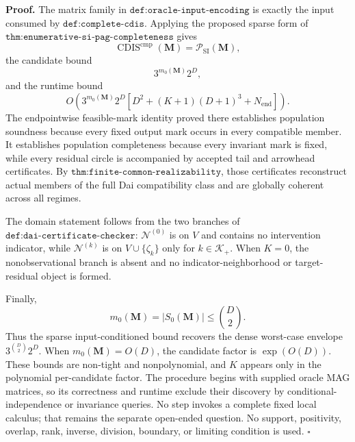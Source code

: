 \textbf{Proof.}
The matrix family in \(\texttt{def:oracle-input-encoding}\) is exactly the input consumed by \(\texttt{def:complete-cdis}\).  Applying the proposed sparse form of \(\texttt{thm:enumerative-si-pag-completeness}\) gives
\[
\operatorname{CDIS}^{\mathrm{cmp}}(\mathbf M)
=\mathcal P_{\mathrm{SI}}(\mathbf M),
\]
the candidate bound
\[
3^{m_0(\mathbf M)}2^D,
\]
and the runtime bound
\[
O\!\left(3^{m_0(\mathbf M)}2^D
\left[D^2+(K+1)(D+1)^3+N_{\mathrm{end}}\right]\right).
\]
The endpointwise feasible-mark identity proved there establishes population soundness because every fixed output mark occurs in every compatible member.  It establishes population completeness because every invariant mark is fixed, while every residual circle is accompanied by accepted tail and arrowhead certificates.  By \(\texttt{thm:finite-common-realizability}\), those certificates reconstruct actual members of the full Dai compatibility class and are globally coherent across all regimes.

The domain statement follows from the two branches of \(\texttt{def:dai-certificate-checker}\): \(\mathcal N^{(0)}\) is on \(V\) and contains no intervention indicator, while \(\mathcal N^{(k)}\) is on \(V\cup\{\zeta_k\}\) only for \(k\in\mathcal K_+\).  When \(K=0\), the nonobservational branch is absent and no indicator-neighborhood or target-residual object is formed.

Finally,
\[
m_0(\mathbf M)=|S_0(\mathbf M)|\le\binom D2.
\]
Thus the sparse input-conditioned bound recovers the dense worst-case envelope \(3^{\binom D2}2^D\).  When \(m_0(\mathbf M)=O(D)\), the candidate factor is \(\exp(O(D))\).  These bounds are non-tight and nonpolynomial, and \(K\) appears only in the polynomial per-candidate factor.  The procedure begins with supplied oracle MAG matrices, so its correctness and runtime exclude their discovery by conditional-independence or invariance queries.  No step invokes a complete fixed local calculus; that remains the separate open-ended question.  No support, positivity, overlap, rank, inverse, division, boundary, or limiting condition is used. \(\square\)